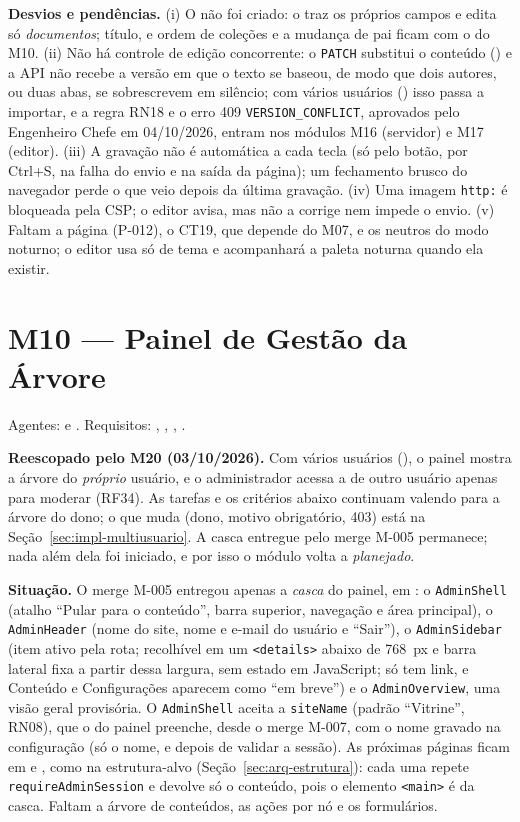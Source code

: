 \textbf{Desvios e pendências.} (i) O  não foi criado: o  traz os próprios campos e edita só \emph{documentos}; título,  e ordem de coleções e a mudança de pai ficam com o  do M10. (ii) Não há controle de edição concorrente: o \texttt{PATCH} substitui o conteúdo () e a API não recebe a versão em que o texto se baseou, de modo que dois autores, ou duas abas, se sobrescrevem em silêncio; com vários usuários () isso passa a importar, e a regra RN18 e o erro 409 \texttt{VERSION\_CONFLICT}, aprovados pelo Engenheiro Chefe em 04/10/2026, entram nos módulos M16 (servidor) e M17 (editor). (iii) A gravação não é automática a cada tecla (só pelo botão, por Ctrl+S, na falha do envio e na saída da página); um fechamento brusco do navegador perde o que veio depois da última gravação. (iv) Uma imagem \texttt{http:} é bloqueada pela CSP; o editor avisa, mas não a corrige nem impede o envio. (v) Faltam a página (P-012), o CT19, que depende do M07, e os neutros do modo noturno; o editor usa só  de tema e acompanhará a paleta noturna quando ela existir.

\section{M10 --- Painel de Gestão da Árvore}\label{sec:impl-painel}

\noindent{}\quad Agentes:  e . Requisitos: , , , .

\textbf{Reescopado pelo M20 (03/10/2026).} Com vários usuários (), o painel mostra a árvore do \emph{próprio} usuário, e o administrador acessa a de outro usuário apenas para moderar (RF34). As tarefas e os critérios abaixo continuam valendo para a árvore do dono; o que muda (dono, motivo obrigatório, 403) está na Seção~\ref{sec:impl-multiusuario}. A casca entregue pelo merge M-005 permanece; nada além dela foi iniciado, e por isso o módulo volta a \emph{planejado}.

\textbf{Situação.} O merge M-005 entregou apenas a \emph{casca} do painel, em : o \texttt{AdminShell} (atalho ``Pular para o conteúdo'', barra superior, navegação e área principal), o \texttt{AdminHeader} (nome do site, nome e e-mail do usuário e ``Sair''), o \texttt{AdminSidebar} (item ativo pela rota; recolhível em um \texttt{<details>} abaixo de 768~px e barra lateral fixa a partir dessa largura, sem estado em JavaScript; só  tem link, e Conteúdo e Configurações aparecem como ``em breve'') e o \texttt{AdminOverview}, uma visão geral provisória. O \texttt{AdminShell} aceita a  \texttt{siteName} (padrão ``Vitrine'', RN08), que o  do painel preenche, desde o merge M-007, com o nome gravado na configuração (só o nome, e depois de validar a sessão). As próximas páginas ficam em  e , como na estrutura-alvo (Seção~\ref{sec:arq-estrutura}): cada uma repete \texttt{requireAdminSession} e devolve só o conteúdo, pois o elemento \texttt{<main>} é da casca. Faltam a árvore de conteúdos, as ações por nó e os formulários.

